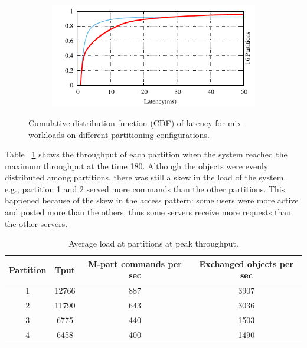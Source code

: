 \begin{figure}[ht!]
\begin{subfigure}{0.48\columnwidth}
  \end{subfigure}
  \begin{subfigure}{0.48\columnwidth}
    \centering
    \includegraphics[width=\textwidth]{./figures/experiments/dynastar/chirper-latency-cdf-16p.pdf}
  \end{subfigure}
  \caption{Cumulative distribution function (CDF) of latency for mix workloads on different partitioning configurations.}
  \label{fig:dynastar-socialcdf}
\end{figure}


Table ~\ref{table:dynastar-socialsnapshot} shows the throughput of each
partition when the \dynastar system reached the maximum throughput at the time 180.
Although the objects were evenly distributed among partitions, there was still a
skew in the load of the system, e.g., partition 1 and 2 served more commands
than the other partitions. This happened because of the skew in the access
pattern: some users were more active and posted more than the others,
thus some servers receive more requests than the other servers.

\begin{table}[htp]
\caption{Average load at partitions at peak throughput.}
\label{table:dynastar-socialsnapshot}
\begin{adjustbox}{max width=\columnwidth}
\vspace{10mm}
\begin{tabular}{|c|c|c|c|}
\hline
Partition & Tput & M-part commands per sec & Exchanged objects per sec \\ \hline
1         & 12766      & 887                      & 3907              \\ \hline
2         & 11790      & 643                      & 3036              \\ \hline
3         & 6775       & 440                      & 1503              \\ \hline
4         & 6458       & 400                      & 1490              \\ \hline
\end{tabular}
\vspace{10mm}
\end{adjustbox}
\end{table}

